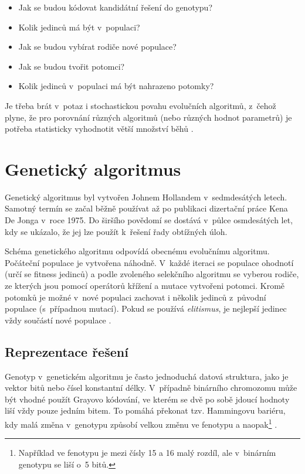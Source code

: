 \begin{itemize}
    \item Jak se budou kódovat kandidátní řešení do genotypu?
    \item Kolik jedinců má být v~populaci?
    \item Jak se budou vybírat rodiče nové populace?
    \item Jak se budou tvořit potomci?
    \item Kolik jedinců v~populaci má být nahrazeno potomky?
\end{itemize}

Je třeba brát v~potaz i stochastickou povahu evolučních algoritmů, z~čehož plyne, že pro porovnání různých algoritmů (nebo různých hodnot parametrů) je potřeba statisticky vyhodnotit větší množství běhů \cite{HandbookEA, Modra}.


\section{Genetický algoritmus}
\label{secGA}

Genetický algoritmus byl vytvořen Johnem Hollandem v~sedmdesátých letech. Samotný termín  se začal běžně používat až po publikaci dizertační práce Kena De Jonga v~roce 1975. Do širšího povědomí se dostává v~půlce osmdesátých let, kdy se ukázalo, že jej lze použít k~řešení řady obtížných úloh.


Schéma genetického algoritmu odpovídá obecnému evolučnímu algoritmu. Počáteční populace je vytvořena náhodně. V~každé iteraci se populace ohodnotí (určí se fitness jedinců) a podle zvoleného selekčního algoritmu se vyberou rodiče, ze kterých jsou pomocí operátorů křížení a mutace vytvořeni potomci. Kromě potomků je možné v~nové populaci zachovat i několik jedinců z~původní populace (s~případnou mutací). Pokud se používá \emph{elitismus}, je nejlepší jedinec vždy součástí nové populace \cite{Modra, HandbookGA}.


\subsection{Reprezentace řešení}

Genotyp v~genetickém algoritmu je často jednoduchá datová struktura, jako je vektor bitů nebo čísel konstantní délky. V~případně binárního chromozomu může být vhodné použít Grayovo kódování, ve kterém se dvě po sobě jdoucí hodnoty liší vždy pouze jedním bitem. To pomáhá překonat tzv. Hammingovu bariéru, kdy malá změna v~genotypu způsobí velkou změnu ve fenotypu a naopak\footnote{Například ve fenotypu je mezi čísly 15 a 16 malý rozdíl, ale v~binárním genotypu se liší o~5 bitů.} \cite{HandbookGA}.


